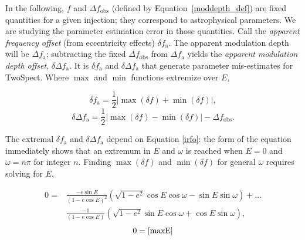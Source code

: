 \documentclass{article}
\begin{document}
In the following, $f$ and $\Delta f_\mathrm{obs}$ (defined by Equation~\ref{moddepth_def}) are fixed quantities for a given injection; they correspond to astrophysical parameters.
We are studying the parameter estimation error in those quantities.
Call the \textit{apparent frequency offset} (from eccentricity effects) $\delta f_\mathrm{a}$.
The apparent modulation depth will be $\Delta f_\mathrm{a}$; subtracting the fixed $\Delta f_\mathrm{obs}$ from $\Delta f_\mathrm{a}$ yields the \textit{apparent modulation depth offset}, $\delta \Delta f_\mathrm{a}$.
It is $\delta f_\mathrm{a}$ and $\delta \Delta f_\mathrm{a}$ that generate parameter mis-estimates for TwoSpect.
Where $\max$ and $\min$ functions extremize over $E$,

\begin{equation}
\delta f_\mathrm{a} = \frac{1}{2} \left| \max(\delta f) + \min(\delta f)\right|,
\label{dfa}
\end{equation}
\begin{equation}
\delta \Delta f_\mathrm{a} = \frac{1}{2} \left| \max(\delta f) - \min(\delta f)\right| - \Delta f_\mathrm{obs}.
\label{ddfa}
\end{equation}

The extremal $\delta f_\mathrm{a}$ and $\delta \Delta f_\mathrm{a}$ depend on Equation \ref{irfo}: the form of the equation immediately shows that an extremum in $E$ and $\omega$ is reached when $E = 0$ and $\omega = n \pi$ for integer $n$.
Finding $\max(\delta f)$ and $\min(\delta f)$ for general $\omega$ requires solving for $E$,

\begin{eqnarray}
0 = &\frac{-e \sin E}{\left(1 - e \cos E \right)^{2}} \left(\sqrt{1-e^2} \cos E \cos \omega - \sin E \sin \omega \right) +\ldots \nonumber \\
    &\frac{-1}{\left(1-e \cos E \right)} \left(\sqrt{1-e^2} \sin E \cos \omega + \cos E \sin \omega \right),
\end{eqnarray}
\begin{equation}
0 = 
\ref{maxE}
\end{equation}
\end{document}

